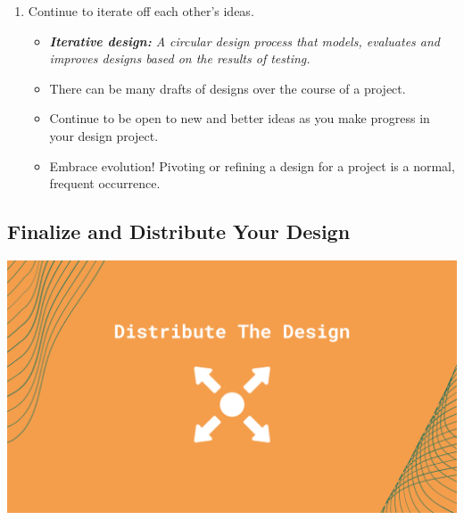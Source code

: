 \documentclass[
]{book}
\providecommand{\tightlist}{%
  \setlength{\itemsep}{0pt}\setlength{\parskip}{0pt}}
\begin{document}
\begin{enumerate}
\def\labelenumi{\arabic{enumi}.}
\setcounter{enumi}{1}
\tightlist
\item
  Continue to iterate off each other's ideas.

  \begin{itemize}
  \tightlist
  \item
    \emph{\textbf{Iterative design:} A circular design process that models, evaluates and improves designs based on the results of testing.}
  \item
    There can be many drafts of designs over the course of a project.
  \item
    Continue to be open to new and better ideas as you make progress in your design project.
  \item
    Embrace evolution! Pivoting or refining a design for a project is a normal, frequent occurrence.
  \end{itemize}
\end{enumerate}

\hypertarget{finalize-and-distribute-your-design}{%
\subsection{Finalize and Distribute Your Design}\label{finalize-and-distribute-your-design}}

\includegraphics{images/Working-With-Graphic-Designers-Graphic-2.png}
\end{document}
